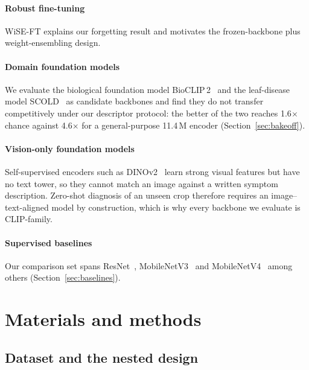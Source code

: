 \documentclass[a4paper,fleqn]{cas-dc}
\begin{document}
\paragraph{Robust fine-tuning} WiSE-FT \citep{wortsman2022} explains our forgetting result and
motivates the frozen-backbone plus weight-ensembling design.

\paragraph{Domain foundation models} We evaluate the biological foundation model
BioCLIP\,2~\citep{bioclip2} and the leaf-disease model SCOLD~\citep{scold2025} as candidate backbones
and find they do not transfer competitively under our descriptor protocol: the better of the
two reaches 1.6$\times$ chance against 4.6$\times$ for a general-purpose 11.4\,M encoder
(Section~\ref{sec:bakeoff}).

\paragraph{Vision-only foundation models} Self-supervised encoders such as
DINOv2~\citep{oquab2024} learn strong visual features but have no text tower, so they cannot match an
image against a written symptom description. Zero-shot diagnosis of an unseen crop therefore requires
an image--text-aligned model by construction, which is why every backbone we evaluate is
CLIP-family.

\paragraph{Supervised baselines} Our comparison set spans ResNet~\citep{he2016},
MobileNetV3~\citep{howard2019} and MobileNetV4~\citep{qin2024} among others
(Section~\ref{sec:baselines}).

\section{Materials and methods}

\subsection{Dataset and the nested design}
\label{sec:data}
\end{document}
